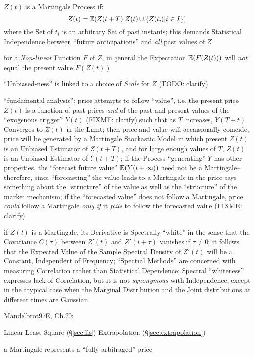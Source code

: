 $Z(t)$ is a Martingale Process if:
\[
  Z(t) = \mathbb{E}(Z(t+T) | Z(t) \cup \{ Z(t_i) | i \in I \})
\]
where the Set of $t_i$ is an arbitrary Set of past instants; this demands
Statistical Independence between ``future anticipations'' and \emph{all} past
values of $Z$

for a \emph{Non-linear} Function $F$ of $Z$, in general the Expectation
$\mathbb{E}(F(Z(t)))$ will \emph{not} equal the present value $F(Z(t))$

``Unbiased-ness'' is linked to a choice of \emph{Scale} for $Z$ (TODO: clarify)

``fundamental analysis'': price attempts to follow ``value'', i.e. the present
price $Z(t)$ is a function of past prices \emph{and} of the past and present
values of the ``exogenous trigger'' $Y(t)$ (FIXME: clarify) such that as $T$
increases, $Y(T + t)$ Converges to $Z(t)$ in the Limit; then price and value
will occaisionally coincide, price will be generated by a Martingale Stochastic
Model in which present $Z(t)$ is an Unbiased Estimator of $Z(t + T)$, and for
large enough values of $T$, $Z(t)$ is an Unbiased Estimator of $Y(t + T)$; if
the Process ``generating'' $Y$ has other properties, the ``forecast future
value'' $\mathbb{E}(Y(t + \infty))$ need not be a Martingale-- therefore, since
``forecasting'' the value leads to a Martingale in the price says something
about the ``structure'' of the value as well as the ``structure'' of the market
mechanism; if the ``forecasted value'' does not follow a Martingale, price
\emph{could} follow a Martingale \emph{only if} it \emph{fails} to follow the
forecasted value (FIXME: clarify)

if $Z(t)$ is a Martingale, its Derivative is Spectrally ``white'' in the sense
that the Covariance $C(\tau)$ between $Z'(t)$ and $Z'(t + \tau)$ vanishes if
$\tau \neq 0$; it follows that the Expected Value of the Sample Spectral Density
of $Z'(t)$ will be a Constant, Independent of Frequency;
``Spectral Methods'' are concerned with measuring Correlation rather than
Statistical Dependence; Spectral ``whiteness'' expresses lack of Correlation,
but it is not \emph{synonymous} with Independence, except in the atypical case
when the Marginal Distribution and the Joint distributions at different times
are Gaussian

Mandelbrot97E, Ch.20:

Linear Least Square (\S\ref{sec:lls}) Extrapolation (\S\ref{sec:extrapolation})

a Martingale represents a ``fully arbitraged'' price

